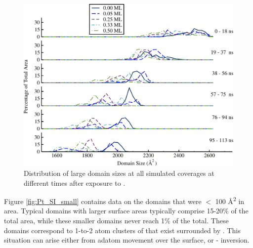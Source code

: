 \begin{figure}
  \centering
  \includegraphics[width=\linewidth]{../figures/appA/domainSizes_Pt_SI_zoomed.pdf}
  \caption{Distribution of large  domain sizes at all simulated
     coverages at different times after exposure to .}
\label{fig:Pt_SI_big}
\end{figure}
\newpage




Figure \ref{fig:Pt_SI_small} contains data on the  domains that
were $<$ 100 \AA\textsuperscript{2} in area.  Typical domains with
larger surface areas typically comprise 15-20\% of the total area,
while these smaller domains never reach 1\% of the total. These
domains correspond to 1-to-2 atom clusters of  that exist
surrounded by . This situation can arise either from 
adatom movement over the  surface, or -
inversion.

